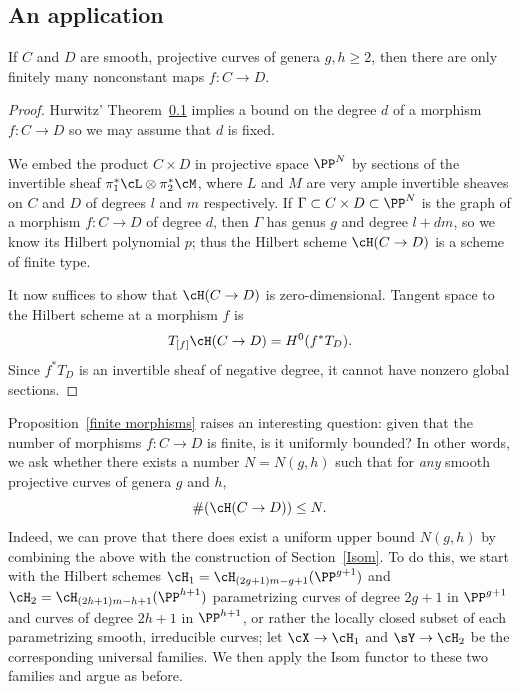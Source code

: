  \subsection{An application}
  
 \begin{proposition}\label{finite morphisms}
 If $C$ and $D$ are smooth, projective curves of genera $g, h \geq 2$, then there are only finitely many nonconstant maps $f : C \to D$.
 \end{proposition}
 
 \begin{proof}
 Hurwitz' Theorem~\ref{} implies a bound on the degree $d$ of a morphism $f : C \to D$ so we may assume that $d$ is fixed.
 
We embed the product $C \times D$ in projective space $\PP^N$ by sections of the invertible sheaf $\pi_1^* \cL \otimes \pi_2^* \cM$, where $L$ and $M$ are very ample invertible sheaves on $C$ and $D$ of degrees $l$ and $m$ respectively. If $\Gamma \subset C \times D \subset \PP^N$ is the graph of a morphism $f : C \to D$ of degree $d$, then $\Gamma$ has genus $g$ and degree $l + dm$, so we know its Hilbert polynomial $p$; thus the Hilbert scheme $\cH(C \to D)$ is a scheme of finite type.
 
 It now suffices to show that $\cH(C \to D)$ is zero-dimensional. Tangent space to the Hilbert scheme at a morphism $f$ is
 $$
 T_{[f]}\cH(C \to D) = H^0(f^*T_D).
 $$
 Since $f^*T_D$ is an invertible sheaf of negative degree, it cannot have nonzero global sections. 
 \end{proof}
 
 

 Proposition~\ref{finite morphisms} raises an interesting question: given that the number of morphisms $f : C \to D$ is finite, is it uniformly bounded? In other words, we ask whether there exists a number $N = N(g,h)$ such that for \emph{any} smooth projective curves of genera $g$ and $h$,
 $$
\# (\cH(C \to D)) \leq N.
 $$
Indeed, we can prove that there does exist a uniform upper bound $N(g,h)$ by combining the above with the construction of Section~\ref{Isom}. To do this, we start with the Hilbert schemes $\cH_1 = \cH_{(2g+1)m -g + 1}(\PP^{g+1})$ and $\cH_2 = \cH_{(2h+1)m -h + 1}(\PP^{h+1})$ parametrizing curves of degree $2g+1$ in $\PP^{g+1}$ and curves of degree $2h+1$ in $\PP^{h+1}$, or rather the locally closed subset of each parametrizing smooth, irreducible curves; let $\cX \to \cH_1$ and $\sY \to \cH_2$ be the corresponding universal families. We then apply the Isom functor to these two families and argue as before.

